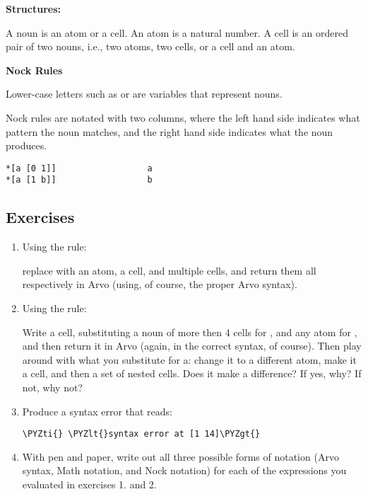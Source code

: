 \textbf{Structures:}

A noun is an atom or a cell.  An atom is a natural number.  A cell is an
ordered pair of two nouns, i.e., two atoms, two cells, or a cell and an atom.

\textbf{Nock Rules}

Lower-case letters such as  or  are variables that represent nouns.

Nock rules are notated with two columns, where the left hand side indicates
what pattern the noun matches, and the right hand side indicates what the noun
produces.
\begin{framed_shaded}
\begin{Verbatim}[fontsize=\relsize{-2.5},commandchars=\\\{\}]
*[a [0 1]]                  a
*[a [1 b]]                  b
\end{Verbatim}
\end{framed_shaded}

\subsection{Exercises}

\begin{enumerate}
\item Using the rule:


replace  with an atom, a cell, and multiple cells, and return them all respectively in Arvo (using, of course, the proper Arvo syntax).  
\item Using the rule:

 Write a cell, substituting a noun of more then 4 cells for , and any atom for , and then return it in Arvo (again, in the correct syntax, of course). Then play around with what you substitute for a: change it to a different atom, make it a cell, and then a set of nested cells. Does it make a difference? If yes, why? If not, why not?
\item Produce a syntax error that reads:
\begin{framed_shaded}
\begin{Verbatim}[fontsize=\relsize{-2.5},commandchars=\\\{\}]
\PYZti{} \PYZlt{}syntax error at [1 14]\PYZgt{}
\end{Verbatim}
\end{framed_shaded}
\item With pen and paper, write out all three possible forms of notation (Arvo syntax, Math notation, and Nock notation) for each
of the expressions you evaluated in exercises 1. and 2.
\end{enumerate}

